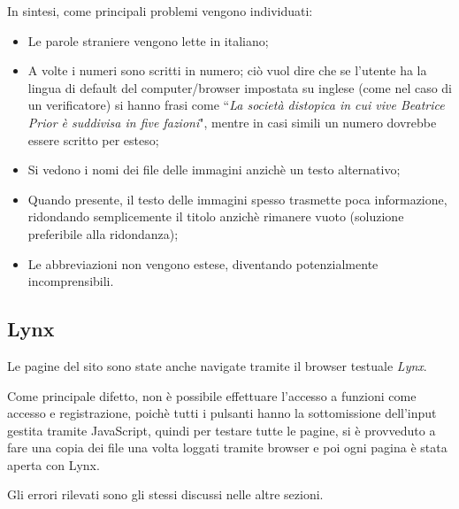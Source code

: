 In sintesi, come principali problemi vengono individuati:
\begin{itemize}
\item Le parole straniere vengono lette in italiano;
\item A volte i numeri sono scritti in numero; ciò vuol dire che se l'utente
ha la lingua di default del computer/browser impostata su inglese (come nel
caso di un verificatore) si hanno frasi come ``\textit{La società distopica in
cui vive Beatrice Prior è suddivisa in five fazioni}", mentre in casi simili
un numero dovrebbe essere scritto per esteso;
\item Si vedono i nomi dei file delle immagini anzichè un testo alternativo;
\item Quando presente, il testo delle immagini spesso trasmette poca
informazione, ridondando semplicemente il titolo anzichè rimanere vuoto
(soluzione preferibile alla ridondanza);
\item Le abbreviazioni non vengono estese, diventando potenzialmente
incomprensibili.
\end{itemize}

\subsection{Lynx}\label{sec:lynx} %
Le pagine del sito sono state anche navigate tramite il browser testuale
\textit{Lynx}.

Come principale difetto, non è possibile effettuare l'accesso a funzioni come
accesso e registrazione, poichè tutti i pulsanti hanno la sottomissione
dell'input gestita tramite JavaScript, quindi per testare tutte le pagine, si è
provveduto a fare una copia dei file una volta loggati tramite browser e poi
ogni pagina è stata aperta con Lynx.

Gli errori rilevati sono gli stessi discussi nelle altre sezioni.
